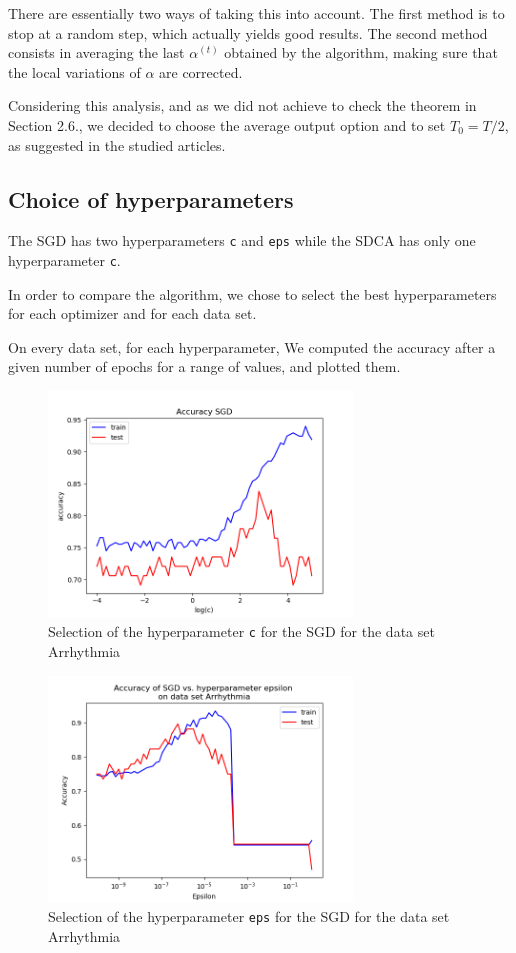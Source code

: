 \documentclass{article}
\begin{document}
There are essentially two ways of taking this into account.
The first method is to stop at a random step, which actually yields good results.
The second method consists in averaging the last $\alpha^{(t)}$ obtained by the algorithm, making sure that the local variations of $\alpha$ are corrected.


Considering this analysis, and as we did not achieve to check the theorem in Section 2.6., we decided to choose the average output option and to set $T_0 = T/2$, as suggested in the studied articles.

\subsection{Choice of hyperparameters}

The SGD has two hyperparameters \texttt{c} and \texttt{eps} while the SDCA has only one hyperparameter \texttt{c}.

In order to compare the algorithm, we chose to select the best hyperparameters for each optimizer and for each data set.

On every data set, for each hyperparameter, We computed the accuracy after a given number of epochs for a range of values, and plotted them.

\begin{figure}[H]
	\centering
	\includegraphics[height=6cm]{figs/hyperparams/SGD_c.png}
	\caption{Selection of the hyperparameter \texttt{c} for the SGD for the data set Arrhythmia}
\end{figure}

\begin{figure}[H]
	\centering
	\includegraphics[height=6cm]{figs/hyperparams/SGD_eps.png}
	\caption{Selection of the hyperparameter \texttt{eps} for the SGD for the data set Arrhythmia}
\end{figure}
\end{document}
